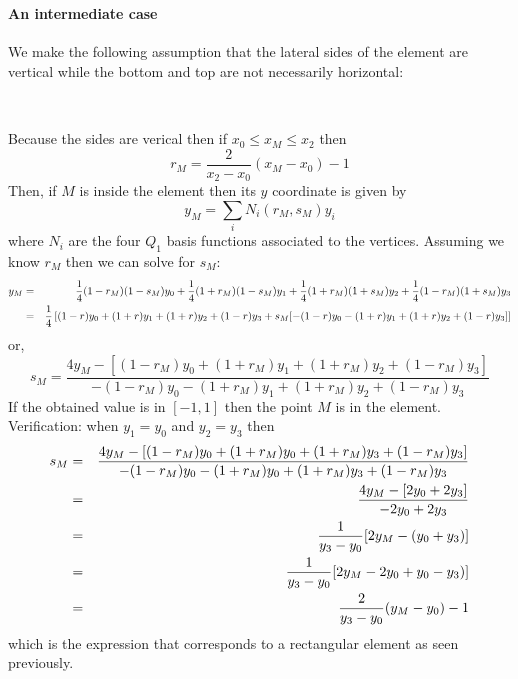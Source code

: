\begin{center}
\\
\end{center}


\paragraph{An intermediate case} We make the following assumption that the lateral sides of the  
element are vertical while the bottom and top are not necessarily horizontal:

\begin{center}
\\
\end{center}

Because the sides are verical then if $x_0 \leq x_M \leq x_2$ then 
\[
r_M = \frac{2}{x_2-x_0}(x_M-x_0) -1 
\]
Then, if $M$ is inside the element then its $y$ coordinate is given by
\[
y_M = \sum_i N_i(r_M,s_M) y_i
\]
where $N_i$ are the four $Q_1$ basis functions associated to the vertices.
Assuming we know $r_M$ then we can solve for $s_M$:
\begin{eqnarray}
y_M &=&  
\frac{1}{4}(1-r_M)(1-s_M) y_0+
\frac{1}{4}(1+r_M)(1-s_M) y_1+
\frac{1}{4}(1+r_M)(1+s_M) y_2+
\frac{1}{4}(1-r_M)(1+s_M) y_3 \nonumber\\
&=& 
\frac{1}{4} \left[
(1-r)y_0+(1+r)y_1+(1+r)y_2+(1-r)y_3 +s_M [ -(1-r)y_0 - (1+r)y_1+(1+r)y_2+(1-r)y_3  ] 
\right] \nonumber 
\end{eqnarray}
or, 
\[
s_M = \frac{ 4y_M - [(1-r_M)y_0+(1+r_M)y_1+(1+r_M)y_2+(1-r_M)y_3]  }{ -(1-r_M)y_0 -(1+r_M)y_1+(1+r_M)y_2+(1-r_M)y_3 } 
\]
If the obtained value is in $[-1,1]$ then the point $M$ is in the element.
Verification: when $y_1=y_0$ and $y_2=y_3$ then 
\begin{eqnarray}
s_M 
&=& \frac{4 y_M - [(1-r_M)y_0+(1+r_M)y_0+(1+r_M)y_3+(1-r_M)y_3]  }{ -(1-r_M)y_0 - (1+r_M)y_0+(1+r_M)y_3+(1-r_M)y_3 } \nonumber\\
&=& \frac{4 y_M - [ 2 y_0 + 2 y_3]  }{ -2 y_0 + 2 y_3    }  \nonumber\\
&=& \frac{1}{y_3-y_0} [2 y_M - (  y_0 +  y_3) ] \nonumber\\ 
&=& \frac{1}{y_3-y_0} [2 y_M -  2 y_0 +y_0 -  y_3)  ] \nonumber\\ 
&=& \frac{2}{y_3-y_0} (y_M - y_0) - 1 
\end{eqnarray}
which is the expression that corresponds to a rectangular element as seen previously.

